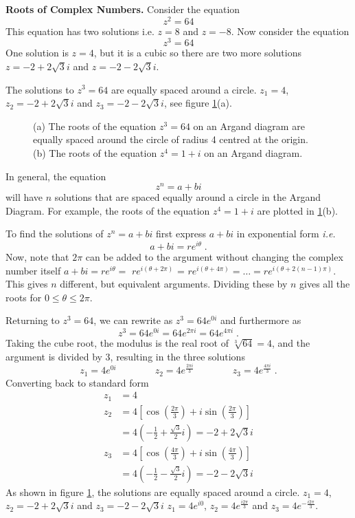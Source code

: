 
\textbf{Roots of Complex Numbers.} Consider the equation
\[
{z}^{2}=64
\]
This equation has two solutions i.e. $z=8$ and $z=-8$. Now consider the equation
\[
{z}^{3}=64
\]
One solution is $z=4$, but it is a cubic so there are two more solutions $z=-2+2\sqrt{3}i$ and $z=-2-2\sqrt{3}i$.

The solutions to ${z}^{3}=64$ are equally spaced around a circle. ${z}_{1}=4$, ${z}_{2}=-2+2\sqrt{3}i$ and ${z}_{3}=-2-2\sqrt{3}i$, see figure \ref{fig:cube_roots}(a).
\begin{figure}
    \centering
    \caption{(a) The roots of the equation $z^3=64$ on an Argand diagram are equally spaced around the circle of radius 4 centred at the origin. (b) The roots of the equation $z^4=1+i$ on an Argand diagram.}
    \label{fig:cube_roots}
\end{figure}

In general, the equation
\[
{z}^{n}=a+bi
\]
will have $n$ solutions that are spaced equally around a circle in the Argand Diagram. For example, the roots of the equation ${z}^{4}=1+i$ are plotted in \ref{fig:cube_roots}(b).

To find the solutions of ${z}^{n}=a+bi$ first express $a+bi $ in exponential form \textit{i.e.}
\[
a + bi = r{e}^{i\theta } \; .
\]
Now, note that $2\pi$ can be added to the argument without changing the complex number itself $a+bi=r{e}^{i\theta }=$ $r{e}^{i(\theta +2\pi )}$ = $r{e}^{i(\theta +4\pi )}=\ldots =r{e}^{i(\theta +2(n-1)\pi )}$. This gives $n$ different, but equivalent arguments. Dividing these by $n$ gives all the roots for $0\leq \theta \leq 2\pi $. 

Returning to ${z}^{3}=64$, we can rewrite as ${z}^{3}=64{e}^{0i}$ and furthermore as
\[
{z}^{3}=64{e}^{0i}=64{e}^{2\pi i}=64{e}^{4\pi i} \; .
\]
Taking the cube root, the modulus is the real root of $\sqrt[3]{64}=4$, and the argument is divided by 3, resulting in the three solutions 
\[{z}_{1}=4{e}^{0i} \qquad \qquad {z}_{2}=4{e}^{\frac{2\pi i}{3}} \qquad \qquad {z}_{3}=4{e}^{\frac{4\pi i}{3}} \; .\]
Converting back to standard form
\begin{align*}
{z}_{1} &=4 \\[4pt]
{z}_{2}&=4\left[\cos \left(\frac{2\pi }{3}\right)+i\sin \left(\frac{2\pi }{3}\right)\right]\\
&=4\left(-\frac{1}{2}+\frac{\sqrt{3}}{2}i\right) =-2+2\sqrt{3}i \\[4pt]
{z}_{3}&=4\left[\cos \left(\frac{4\pi }{3}\right)+i\sin \left(\frac{4\pi }{3}\right)\right]\\
&=4\left(-\frac{1}{2}-\frac{\sqrt{3}}{2}i\right) = -2-2\sqrt{3}i
\end{align*}
As shown in figure \ref{fig:cube_roots}, the solutions are equally spaced around a circle. ${z}_{1}=4$, ${z}_{2}=-2+2\sqrt{3}i$ and ${z}_{3}=-2-2\sqrt{3}i$ ${z}_{1}=4{e}^{i0}$, ${z}_{2}=4{e}^{\frac{i2\pi }{3}}$ and ${z}_{3}=4{e}^{-\frac{i2\pi }{3}}$.

